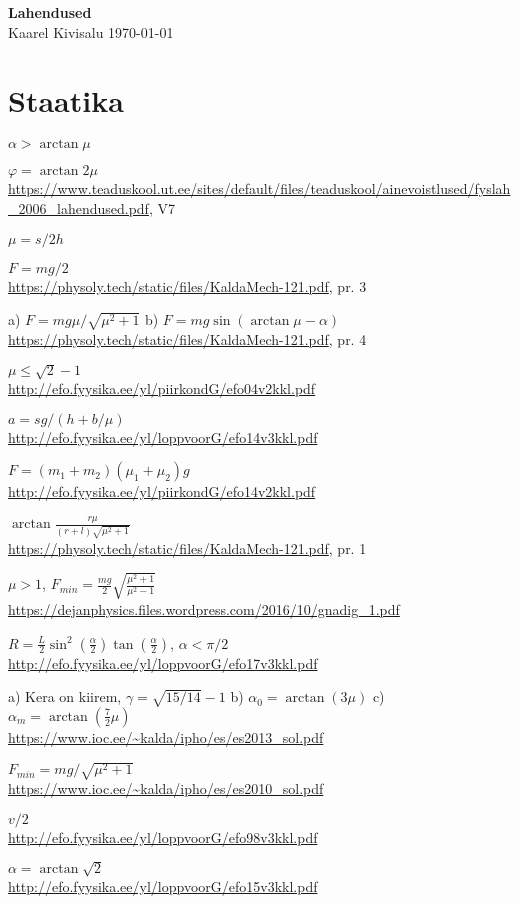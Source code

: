 \documentclass[a4paper,11pt,twocolumn]{article}
\begin{document}
{\huge \textbf{Lahendused}} \\
{Kaarel Kivisalu \hfill \today}

\section{Staatika}
\begin{solutions}
	\item \( \alpha>\arctan \mu \) \\
	\item \( \varphi=\arctan 2\mu \) \\ \url{https://www.teaduskool.ut.ee/sites/default/files/teaduskool/ainevoistlused/fyslah_2006_lahendused.pdf}, V7
	\item \( \mu=s/2h \)
	\item \( F=mg/2 \) \\ \url{https://physoly.tech/static/files/KaldaMech-121.pdf}, pr. 3
	\item a) \( F=mg\mu/\sqrt{\mu^2+1} \) b) \( F=mg \sin (\arctan \mu -\alpha) \) \\ \url{https://physoly.tech/static/files/KaldaMech-121.pdf}, pr. 4
	\item \( \mu \le \sqrt{2}-1 \) \\ \url{http://efo.fyysika.ee/yl/piirkondG/efo04v2kkl.pdf}
	\item
	\item \( a=sg/(h+b/\mu) \) \\ \url{http://efo.fyysika.ee/yl/loppvoorG/efo14v3kkl.pdf}
	\item \( F=(m_1+m_2)(\mu_1+\mu_2)g \) \\ \url{http://efo.fyysika.ee/yl/piirkondG/efo14v2kkl.pdf}
	\item \( \arctan \frac{r\mu}{(r+l)\sqrt{\mu^2+1}} \) \\ \url{https://physoly.tech/static/files/KaldaMech-121.pdf}, pr. 1
	\item \( \mu > 1 \), \( F_{min}=\frac{mg}{2} \sqrt{\frac{\mu^2+1}{\mu^2-1}} \) \\
	\url{https://dejanphysics.files.wordpress.com/2016/10/gnadig_1.pdf}
	\item \( R=\frac{L}{2}\sin^2(\frac{\alpha}{2})\tan(\frac{\alpha}{2}) \), \( \alpha < \pi/2 \)\\ \url{http://efo.fyysika.ee/yl/loppvoorG/efo17v3kkl.pdf}
	\item a) Kera on kiirem, \( \gamma=\sqrt{15/14}-1 \) b) \( \alpha_0=\arctan(3\mu) \) c) \( \alpha_m=\arctan(\frac{7}{2}\mu) \)  \\ \url{https://www.ioc.ee/~kalda/ipho/es/es2013_sol.pdf}
	\item \( F_{min}={mg}/{\sqrt{\mu^2+1}} \) \\ \url{https://www.ioc.ee/~kalda/ipho/es/es2010_sol.pdf}
	\item \( v/2 \) \\ \url{http://efo.fyysika.ee/yl/loppvoorG/efo98v3kkl.pdf}
	\item \( \alpha=\arctan\sqrt{2} \)\\ \url{http://efo.fyysika.ee/yl/loppvoorG/efo15v3kkl.pdf}
\end{solutions}
\end{document}
